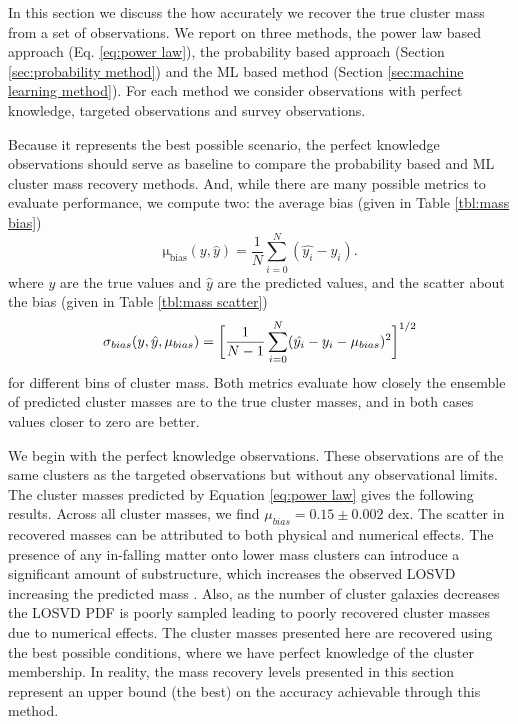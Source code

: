 \documentclass[fleqn,usenatbib]{mnras}
\begin{document}
In this section we discuss the how accurately we recover the true cluster mass from a set of observations. We report on three methods, the power law based approach (Eq. \ref{eq:power law}), the probability based approach (Section \ref{sec:probability method}) and the ML based method (Section \ref{sec:machine learning method}). For each method we consider observations with perfect knowledge, targeted observations and survey observations.

Because it represents the best possible scenario, the perfect knowledge observations should serve as baseline to compare the probability based and ML cluster mass recovery methods. And, while there are many possible metrics to evaluate performance, we compute two: the average bias (given in Table \ref{tbl:mass bias})
\begin{equation}
\mathrm{\mu_{bias}}(y,\hat{y}) = \frac{1}{N} \sum_{i=0}^N (\hat{y_i} - y_i).
\end{equation}
where $y$ are the true values and $\hat{y}$ are the predicted values, and the scatter about the bias (given in Table \ref{tbl:mass scatter})
\begin{equation}
	\sigma_{bias}(y,\hat{y}, \mu_{bias}) = \bigg{[}\frac{1}{N-1} \sum_{i=0}^N (\hat{y_i} - y_i - \mu_{bias})^2 \bigg{]}^{1/2}
\end{equation}
for different bins of cluster mass. Both metrics evaluate how closely the ensemble of predicted cluster masses are to the true cluster masses, and in both cases values closer to zero are better.

We begin with the perfect knowledge observations. These observations are of the same clusters as the targeted observations but without any observational limits. The cluster masses predicted by Equation \ref{eq:power law} gives the following results. Across all cluster masses, we find $\mu_{bias} = 0.15\pm{0.002}$ dex. The scatter in recovered masses can be attributed to both physical and numerical effects. The presence of any in-falling matter onto lower mass clusters can introduce a significant amount of substructure, which increases the observed LOSVD increasing the predicted mass . Also, as the number of cluster galaxies decreases the LOSVD PDF is poorly sampled leading to poorly recovered cluster masses due to numerical effects. The cluster masses presented here are recovered using the best possible conditions, where we have perfect knowledge of the cluster membership. In reality, the mass recovery levels presented in this section represent an upper bound (the best) on the accuracy achievable through this method.
\end{document}
